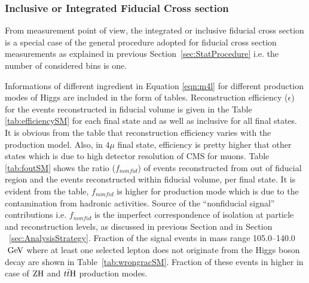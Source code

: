 \subsubsection{Inclusive or Integrated Fiducial Cross section}
\par From measurement point of view, the integrated or inclusive fiducial cross section is a special case of the general procedure adopted for fiducial cross section measurements as explained in previous Section~\ref{sec:StatProcedure} i.e. the number of considered bins is one.
\par
Informations of different ingredient in Equation \ref{eqn:m4l} for different production modes of Higgs are included in the form of tables.
Reconstruction efficiency ($\epsilon$) for the events reconstructed in fiducial volume is given in the Table \ref{tab:efficiencySM} for each final state and as well as inclusive for all final states. It is obvious from the table that reconstruction efficiency varies with the production model. Also, in $4\mu$ final state, efficiency is pretty higher that other states which is due to high detector resolution of CMS for muons. 
Table \ref{tab:foutSM} shows the ratio ($f_{nonfid}$)
of events reconstructed from out of fiducial region and the events reconstructed within fiducial volume, per
final state. It is evident from the table, $f_{nonfid}$ is higher for \ttH production mode which is due to the contamination from hadronic activities.  Source of the ``nonfiducial signal'' contributions i.e. $f_{nonfid}$ is the imperfect correspondence of isolation at particle and reconstruction levels, as discussed in previous Section and in Section ~\ref{sec:AnalysisStrategy}.
Fraction of the signal events in mass range 105.0--140.0 $\hbox{$\;\hbox{\rm GeV}$}$  where at least one selected lepton does not originate from the Higgs boson decay are shown in Table~\ref{tab:wrongracSM}. Fraction of these events in higher in case of ${\rm ZH}$ and $t\bar{t}{\rm H}$ production modes.

